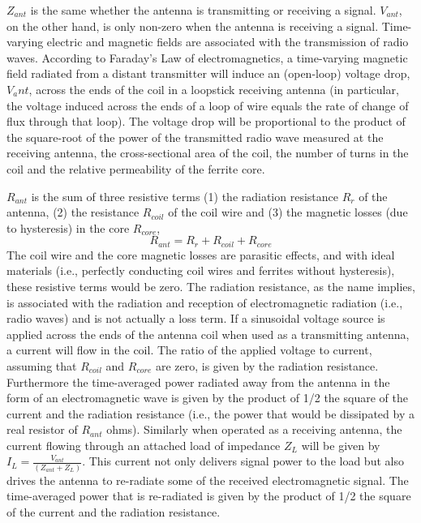 \documentclass[a4paper]{article}
\begin{document}
$Z_{ant}$ is the same whether the antenna is transmitting or receiving a signal. $V_{ant}$, on the other hand, is only non-zero when the antenna is receiving a signal. Time-varying electric and magnetic fields are associated with the transmission of radio waves. According to Faraday’s Law of electromagnetics, a time-varying magnetic field radiated from a distant transmitter will induce an (open-loop) voltage drop, $V_ant$, across the ends of the coil in a loopstick receiving antenna (in particular, the voltage induced across the ends of a loop of wire equals the rate of change of flux through that loop). The voltage drop will be proportional to the product of the square-root of the power of the transmitted radio wave measured at the receiving antenna, the cross-sectional area of the coil, the number of turns in the coil and the relative permeability of the ferrite core.

$R_{ant}$ is the sum of three resistive terms (1) the radiation resistance $R_r$ of the antenna, (2) the resistance $R_{coil}$ of the coil wire and (3) the magnetic losses (due to hysteresis) in the core $R_{core}$,
\begin{equation}
	R_{ant} = R_r + R_{coil} + R_{core}
\end{equation}
The coil wire and the core magnetic losses are parasitic effects, and with ideal materials (i.e., perfectly conducting coil wires and ferrites without hysteresis), these resistive terms would be zero. The radiation resistance, as the name implies, is associated with the radiation and reception of electromagnetic radiation (i.e., radio waves) and is not actually a loss term. If a sinusoidal voltage source is applied across the ends of the antenna coil when used as a transmitting antenna, a current will flow in the coil. The ratio of the applied voltage to current, assuming that $R_{coil}$ and $R_{core}$ are zero, is given by the radiation resistance. Furthermore the time-averaged power radiated away from the antenna in the form of an electromagnetic wave is given by the product of 1/2 the square of the current and the radiation resistance (i.e., the power that would be dissipated by a real resistor of $R_{ant}$ ohms). Similarly when operated as a receiving antenna, the current flowing through an attached load of impedance $Z_L$ will be given by $I_L=\frac{V_{ant}}{(Z_{ant}+Z_L)}$. This current not only delivers signal power to the load but also drives the antenna to re-radiate some of the received electromagnetic signal. The time-averaged power that is re-radiated is given by the product of 1/2 the square of the current and the radiation resistance.
\end{document}
